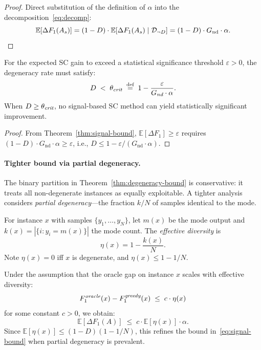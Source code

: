 \begin{proof}
Direct substitution of the definition of $\alpha$ into the decomposition~\eqref{eq:decomp}:
\[
\mathbb{E}[\Delta F_1(A_s)] = (1-D) \cdot \mathbb{E}[\Delta F_1(A_s) \mid \mathcal{D}_{\neg D}] = (1-D) \cdot G_{\text{nd}} \cdot \alpha. \qedhere
\]
\end{proof}

\begin{corollary}
\label{cor:theta-critical}
For the expected SC gain to exceed a statistical significance threshold $\varepsilon > 0$, the degeneracy rate must satisfy:
\begin{equation}
\label{eq:theta-critical}
D \;<\; \theta_{\emph{crit}} \;\stackrel{\text{def}}{=}\; 1 - \frac{\varepsilon}{G_{\emph{nd}} \cdot \alpha}.
\end{equation}
When $D \geq \theta_{\emph{crit}}$, no signal-based SC method can yield statistically significant improvement.
\end{corollary}

\begin{proof}
From Theorem~\ref{thm:signal-bound}, $\mathbb{E}[\Delta F_1] \geq \varepsilon$ requires $(1-D) \cdot G_{\text{nd}} \cdot \alpha \geq \varepsilon$, i.e., $D \leq 1 - \varepsilon / (G_{\text{nd}} \cdot \alpha)$.
\end{proof}

\paragraph{Tighter bound via partial degeneracy.}
The binary partition in Theorem~\ref{thm:degeneracy-bound} is conservative: it treats all non-degenerate instances as equally exploitable. A tighter analysis considers \emph{partial degeneracy}---the fraction $k/N$ of samples identical to the mode.

\begin{definition}
\label{def:effective-diversity}
For instance $x$ with samples $\{y_1, \ldots, y_N\}$, let $m(x)$ be the mode output and $k(x) = |\{i : y_i = m(x)\}|$ the mode count. The \emph{effective diversity} is
\[
\eta(x) = 1 - \frac{k(x)}{N}.
\]
Note $\eta(x) = 0$ iff $x$ is degenerate, and $\eta(x) \leq 1 - 1/N$.
\end{definition}

\begin{proposition}
\label{prop:diversity-bound}
Under the assumption that the oracle gap on instance $x$ scales with effective diversity:
\[
F_1^{\emph{oracle}}(x) - F_1^{\emph{greedy}}(x) \;\leq\; c \cdot \eta(x)
\]
for some constant $c > 0$, we obtain:
\begin{equation}
\label{eq:diversity-bound}
\mathbb{E}[\Delta F_1(A)] \;\leq\; c \cdot \mathbb{E}[\eta(x)] \cdot \alpha.
\end{equation}
Since $\mathbb{E}[\eta(x)] \leq (1-D)(1-1/N)$, this refines the bound in~\eqref{eq:signal-bound} when partial degeneracy is prevalent.
\end{proposition}

